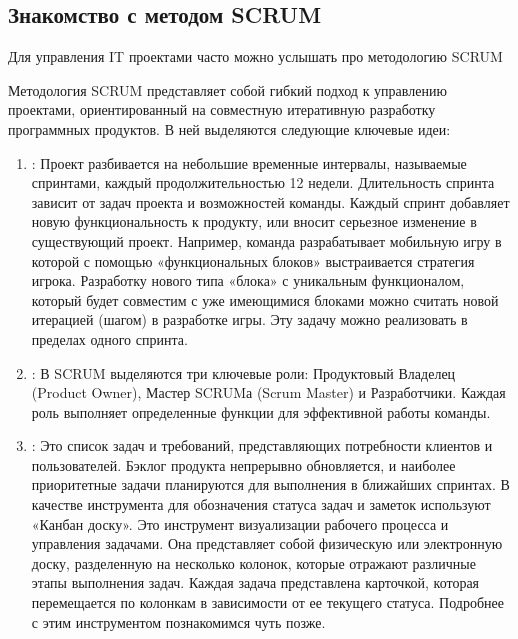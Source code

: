 \documentclass[letterpaper,10pt,russian]{sphinxmanual}
\begin{document}
\subsection{Знакомство с методом SCRUM}
\label{\detokenize{educational_materials/team_work_on_a_project/content:scrum}}
\sphinxAtStartPar
Для управления IT проектами часто можно услышать про методологию SCRUM

\sphinxAtStartPar
Методология SCRUM представляет собой гибкий подход к управлению проектами, ориентированный на совместную итеративную разработку программных продуктов. В ней выделяются следующие ключевые идеи:
\begin{enumerate}
%
\item {} 
\sphinxAtStartPar
{}: Проект разбивается на небольшие временные интервалы, называемые спринтами, каждый продолжительностью 1\sphinxhyphen{}2 недели. Длительность спринта зависит от задач проекта и возможностей команды. Каждый спринт добавляет новую функциональность к продукту, или вносит серьезное изменение в существующий проект. Например, команда разрабатывает мобильную игру в которой с помощью «функциональных блоков» выстраивается стратегия игрока. Разработку нового типа «блока» с уникальным функционалом, который будет совместим с уже имеющимися блоками можно считать новой итерацией (шагом) в разработке игры. Эту задачу можно реализовать в пределах одного спринта.

\item {} 
\sphinxAtStartPar
{}: В SCRUM выделяются три ключевые роли: Продуктовый Владелец (Product Owner), Мастер SCRUMа (Scrum Master) и Разработчики. Каждая роль выполняет определенные функции для эффективной работы команды.

\item {} 
\sphinxAtStartPar
{}: Это список задач и требований, представляющих потребности клиентов и пользователей. Бэклог продукта непрерывно обновляется, и наиболее приоритетные задачи планируются для выполнения в ближайших спринтах. В качестве инструмента для обозначения статуса задач и заметок используют «Канбан доску». Это инструмент визуализации рабочего процесса и управления задачами. Она представляет собой физическую или электронную доску, разделенную на несколько колонок, которые отражают различные этапы выполнения задач. Каждая задача представлена карточкой, которая перемещается по колонкам в зависимости от ее текущего статуса. Подробнее с этим инструментом познакомимся чуть позже.


\end{enumerate}
\end{document}
